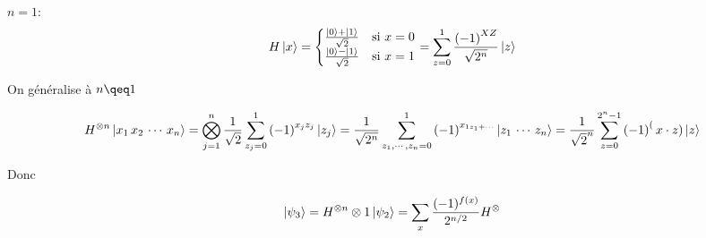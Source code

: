 $n=1:$ 
$$H \ket{x} = \begin{cases}
	\frac{\ket{0}+ \ket{1}}{\sqrt{2}} & \text{si }x=0\\
	\frac{\ket{0}-\ket{1}}{\sqrt{2}}& \text{si } x=1 
\end{cases} = \sum_{z=0}^{1} \frac{\left( -1 \right) ^{XZ}}{\sqrt{2^n}} \ket{z} $$ 

On généralise à $n \qeq 1$   

$$H^{ \otimes n } \ket{x_1 \, x_2 \, \dotsb \, x_n } = \bigotimes_{j=1}^n \frac{1}{\sqrt{2}} \sum_{z_j=0}^{1} \left( -1 \right)^{x_j z_{j}}\ket{z_{j}} = \frac{1}{\sqrt{2^n}} \sum_{z_1 , \dotsb, z_n =0}^{1} \left( -1 \right) ^{x_{1z_1+\dotsb}} \ket{z_1 \, \dotsb \, z_n } = \frac{1}{\sqrt{2}^n} \sum_{z=0}^{2^n-1} \left( -1 \right)^(x \cdot z) \ket{z}$$ 

Donc 

$$\ket{\psi_{3}} = H^{ \otimes n } \otimes 1 \ket{\psi_{2}} = \sum_x \frac{(-1)^{f(x)}}{2^{n/2}} H^{ \otimes } $$ 








